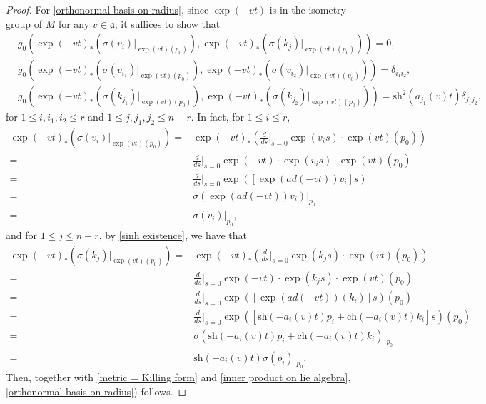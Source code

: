 \documentclass[10pt,a4paper]{amsart}
\begin{document}
\begin{proof}
    For \eqref{orthonormal basis on radius}, since $\exp(-v t)$ is in the isometry group of $M$ for any $v\in \mathfrak{a}$, it suffices to show that 
    \begin{align*}
        &g_0(\exp(-vt)_*(\sigma(v_i)|_{\exp(vt)(p_0)}),\exp(-vt)_*(\sigma(k_j)|_{\exp(vt)(p_0)})) = 0,\\
        &g_0(\exp(-vt)_*(\sigma(v_{i_1})|_{\exp(vt)(p_0)}),\exp(-vt)_*(\sigma(v_{i_2})|_{\exp(vt)(p_0)})) = \delta_{i_1i_2},\\
        &g_0(\exp(-vt)_*(\sigma(k_{j_1})|_{\exp(vt)(p_0)}),\exp(-vt)_*(\sigma(k_{j_2})|_{\exp(vt)(p_0)})) = \mathrm{sh}^2(a_{j_1}(v)t)\delta_{j_1j_2}, 
    \end{align*}
    for $1 \leq i, i_1, i_2 \leq r$ and $1 \leq j, j_1, j_2 \leq n - r$. In fact, for $1 \leq i \leq r$, 
    \begin{align*}
        \exp(-vt)_*(\sigma(v_i)|_{\exp(vt)(p_0)}) 
        =& \exp(-vt)_*(\frac{d}{ds} \bigg|_{s = 0} \exp(v_is)\cdot\exp(vt)(p_0))\\
        =& \frac{d}{ds} \bigg|_{s = 0} \exp(-vt)\cdot\exp(v_is)\cdot \exp(vt)(p_0)\\
        =& \frac{d}{ds} \bigg|_{s = 0} \exp([\exp(ad(-vt))v_i]s)\\
        =& \sigma(\exp(ad(-vt))v_i)|_{p_0}\\
        =& \sigma(v_i)|_{p_0},
    \end{align*}
    and for $1\leq j \leq n - r$, by \eqref{sinh existence}, we have that 
    \begin{align*}
        \exp(-vt)_*(\sigma(k_j)|_{\exp(vt)(p_0)}) 
        =& \exp(-vt)_*(\frac{d}{ds}  \bigg|_{s = 0}  \exp(k_js) \cdot \exp(vt)(p_0))\\
        =& \frac{d}{ds} \bigg|_{s = 0} \exp(-vt)\cdot\exp(k_js)\cdot\exp(vt)(p_0)\\
        =& \frac{d}{ds} \bigg|_{s = 0} \exp([\exp(ad(-vt))(k_i)]s)(p_0)\\
        =& \frac{d}{ds} \bigg|_{s = 0} \exp([\mathrm{sh}(-a_i(v)t)p_i + \mathrm{ch}(-a_i(v)t)k_i]s)(p_0)\\
        =& \sigma(\mathrm{sh}(-a_i(v)t)p_i + \mathrm{ch}(-a_i(v)t)k_i)|_{p_0}\\
        =& \mathrm{sh}(-a_i(v)t)\sigma(p_i)|_{p_0}. 
    \end{align*}
    Then, together with \eqref{metric = Killing form} and \eqref{inner product on lie algebra}, \eqref{orthonormal basis on radius}) follows. 


\end{proof}
\end{document}
